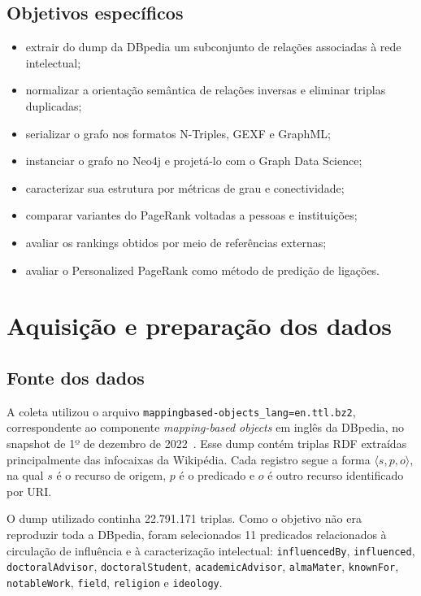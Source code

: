 \documentclass[10pt,a4paper]{article}
\begin{document}
\subsection{Objetivos específicos}

\begin{itemize}
  \item extrair do dump da DBpedia um subconjunto de relações associadas à rede intelectual;
  \item normalizar a orientação semântica de relações inversas e eliminar triplas duplicadas;
  \item serializar o grafo nos formatos N-Triples, GEXF e GraphML;
  \item instanciar o grafo no Neo4j e projetá-lo com o Graph Data Science;
  \item caracterizar sua estrutura por métricas de grau e conectividade;
  \item comparar variantes do PageRank voltadas a pessoas e instituições;
  \item avaliar os rankings obtidos por meio de referências externas;
  \item avaliar o Personalized PageRank como método de predição de ligações.
\end{itemize}

\section{Aquisição e preparação dos dados}

\subsection{Fonte dos dados}

A coleta utilizou o arquivo \texttt{mappingbased-objects\_lang=en.ttl.bz2}, correspondente ao componente \textit{mapping-based objects} em inglês da DBpedia, no snapshot de 1º de dezembro de 2022~\cite{dbpedia-dump}. Esse dump contém triplas RDF extraídas principalmente das infocaixas da Wikipédia. Cada registro segue a forma $\langle s,p,o\rangle$, na qual $s$ é o recurso de origem, $p$ é o predicado e $o$ é outro recurso identificado por URI.

O dump utilizado continha 22.791.171 triplas. Como o objetivo não era reproduzir toda a DBpedia, foram selecionados 11 predicados relacionados à circulação de influência e à caracterização intelectual: \texttt{influencedBy}, \texttt{influenced}, \texttt{doctoralAdvisor}, \texttt{doctoralStudent}, \texttt{academicAdvisor}, \texttt{almaMater}, \texttt{knownFor}, \texttt{notableWork}, \texttt{field}, \texttt{religion} e \texttt{ideology}.
\end{document}
